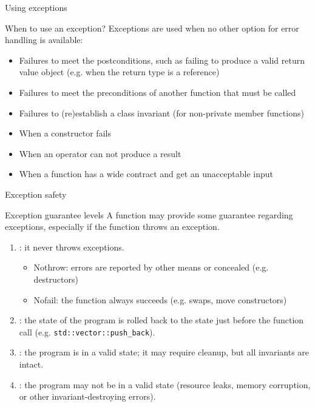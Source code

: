 \begin{frame}{Using exceptions}{}
  \begin{block}{When to use an exception?}
    Exceptions are used when no other option for error handling is available:
    \begin{itemize}
    \item
      Failures to meet the postconditions, such as failing to produce a valid return value object (e.g. when the return type is a reference)
    \item
      Failures to meet the preconditions of another function that must be called
    \item
      Failures to (re)establish a class invariant (for non-private member functions)
    \end{itemize}
  \end{block}

  \begin{examples}
    \begin{itemize}
    \item
      When a constructor fails
    \item
      When an operator can not produce a result
    \item
      When a function has a wide contract and get an unacceptable input
    \end{itemize}
  \end{examples}
\end{frame}

\begin{frame}{Exception safety}{}
  \begin{block}{Exception guarantee levels}
    A function may provide some guarantee regarding exceptions, especially if the function throws an exception.
    \begin{enumerate}
    \item
      : it never throws exceptions.
      \begin{itemize}
      \item
        Nothrow: errors are reported by other means or concealed (e.g. destructors)
      \item
        Nofail: the function always succeeds (e.g. swaps, move constructors)
      \end{itemize}
    \item
      : the state of the program is rolled back to the state just before the function call (e.g. \lstinline!std::vector::push_back!).
    \item
      : the program is in a valid state; it may require cleanup, but all invariants are intact.
    \item
      : the program may not be in a valid state (resource leaks, memory corruption, or other invariant-destroying errors).
    \end{enumerate}
  \end{block}
\end{frame}


